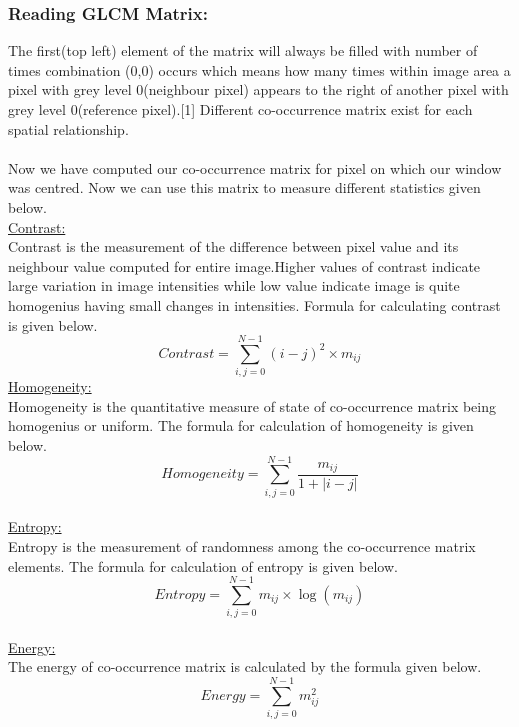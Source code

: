 \documentclass{article}
\begin{document}
\subsubsection{Reading GLCM Matrix:}
The first(top left) element of the matrix will always be filled with number of times combination (0,0) occurs which means how many times within image area a pixel with grey level 0(neighbour pixel) appears to the right of another pixel with grey level 0(reference pixel).[1] Different co-occurrence matrix exist for each spatial relationship.\\
\\
Now we have computed our co-occurrence matrix for pixel on which our window was centred. Now we can use this matrix to measure different statistics given below.\\
\underline{Contrast:}\\
Contrast is the measurement of the difference between pixel value and its neighbour value computed for entire image.Higher values of contrast indicate large variation in image intensities while low value indicate image is quite homogenius having small changes in intensities. Formula for calculating contrast is given below.
\[ Contrast = \sum_{i,j=0}^{N-1}(i - j)^{2} \times m_{i j} \]
\underline{Homogeneity:}\\
Homogeneity is the quantitative measure of state of co-occurrence matrix being homogenius or uniform. The formula for calculation of homogeneity is given below.
\[ Homogeneity = \sum_{i,j=0}^{N-1}\frac{m_{ij}}{1+\left | i-j \right |} \]
\\
\underline{Entropy:}\\
Entropy is the measurement of randomness among the co-occurrence matrix elements. The formula for calculation of entropy is given below.
\[ Entropy = \sum_{i,j=0}^{N-1}m_{ij}\times \log \left ( m_{ij} \right ) \]
\\
\underline{Energy:}\\
The energy of co-occurrence matrix is calculated by the formula given below.
\[ Energy=\sum _{i,j=0}^{N-1}m_{ij}^{2} \]
\end{document}
